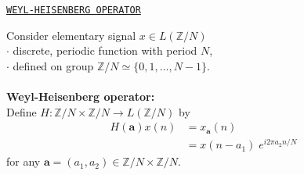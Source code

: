 \documentclass{slides}
\def\Z{\mathbb{Z}}    %
\def\a{\mathbf{a}}
\begin{document}
\begin{slide}%
\begin{center}{\tt \underline{WEYL-HEISENBERG OPERATOR}}\end{center}
Consider elementary signal $x \in L(\Z/N)$\\
$\cdot$ discrete, periodic function with period $N$,\\
$\cdot$ defined on group $\Z/N \simeq \{0,1,\ldots,N-1\}$.\\
\\
{\bf Weyl-Heisenberg operator:}\\
Define $H : \Z /N \times \Z /N \rightarrow  L(\Z /N)$ by
\begin{align*}
H(\a)x(n) &= x_\a(n) \nonumber\\
&= x(n-a_1)\;e^{i2\pi a_2n/N}
\end{align*}
for any $\a = (a_1,a_2) \in \Z /N \times \Z /N$.
\end{slide}
\end{document}
